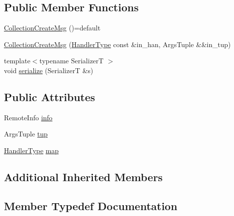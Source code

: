 \subsection*{Public Member Functions}
\begin{DoxyCompactItemize}
\item 
\hyperlink{structvt_1_1vrt_1_1collection_1_1_collection_create_msg_a26a913507e16eabcb1949dc0f01d2b31}{Collection\+Create\+Msg} ()=default
\item 
\hyperlink{structvt_1_1vrt_1_1collection_1_1_collection_create_msg_a9510a76104b8c7d619b0846d3734fa0c}{Collection\+Create\+Msg} (\hyperlink{namespacevt_af64846b57dfcaf104da3ef6967917573}{Handler\+Type} const \&in\+\_\+han, Args\+Tuple \&\&in\+\_\+tup)
\item 
{\footnotesize template$<$typename SerializerT $>$ }\\void \hyperlink{structvt_1_1vrt_1_1collection_1_1_collection_create_msg_a90036f40816bf04321ea62d03a455a47}{serialize} (SerializerT \&s)
\end{DoxyCompactItemize}
\subsection*{Public Attributes}
\begin{DoxyCompactItemize}
\item 
Remote\+Info \hyperlink{structvt_1_1vrt_1_1collection_1_1_collection_create_msg_a7c959b39f6f42a9e174d9658978cf93b}{info}
\item 
Args\+Tuple \hyperlink{structvt_1_1vrt_1_1collection_1_1_collection_create_msg_a5be3c55f9dd0d77e5d576541f204fc26}{tup}
\item 
\hyperlink{namespacevt_af64846b57dfcaf104da3ef6967917573}{Handler\+Type} \hyperlink{structvt_1_1vrt_1_1collection_1_1_collection_create_msg_a72c6c45b7caee61689cd45873d7ef876}{map}
\end{DoxyCompactItemize}
\subsection*{Additional Inherited Members}


\subsection{Member Typedef Documentation}
\mbox{\label{structvt_1_1vrt_1_1collection_1_1_collection_create_msg_abb55583fc386581742c169c93840744f}} 
